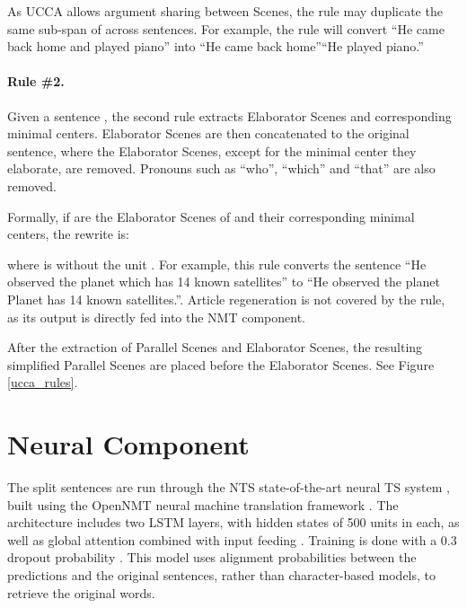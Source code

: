 \documentclass[11pt,a4paper]{article}
\begin{document}
{\small }

\vspace{-0.6cm}
As UCCA allows argument sharing between Scenes, the rule may duplicate the same sub-span of  
across sentences.
For example, the rule will convert ``He came back home and played piano'' 
into ``He came back home''``He played piano.'' 

\paragraph{Rule \#2.}
Given a sentence , the second rule extracts Elaborator Scenes and corresponding minimal centers. 
Elaborator Scenes are then concatenated to the original sentence, where the Elaborator Scenes, 
except for the minimal center they elaborate, are removed. 
Pronouns such as ``who'', ``which'' and ``that'' are also removed. 

Formally, if  are the Elaborator Scenes of  
and their corresponding minimal centers, the rewrite is:
\vspace{-0.3cm}

{\small }
\vspace{-0.4cm}

\noindent
where  is  without the unit .
For example, this rule converts the sentence ``He observed the planet which has 14 known satellites'' 
to  ``He observed the planet Planet has 14 known satellites.''.
Article regeneration is not covered by the rule, as its output is directly fed into the NMT component.

After the extraction of Parallel Scenes and Elaborator Scenes, the resulting simplified Parallel Scenes are placed before the Elaborator Scenes. 
See Figure \ref{ucca_rules}.

\vspace{-0.2cm}
\section{Neural Component}\label{sec:neural-based}
\vspace{-0.1cm}

The split sentences are run through the NTS state-of-the-art neural TS system \citep{Ni17}, 
built using the OpenNMT neural machine translation framework \citep{K17}. 
The architecture includes two LSTM layers, with hidden states of 500 units in each,
as well as global attention combined with input feeding \citep{L15}. Training is done with a 0.3 dropout probability \citep{Sr14}.
This model uses alignment probabilities between the predictions and the original sentences, rather than character-based models, to retrieve the original words.
\end{document}
